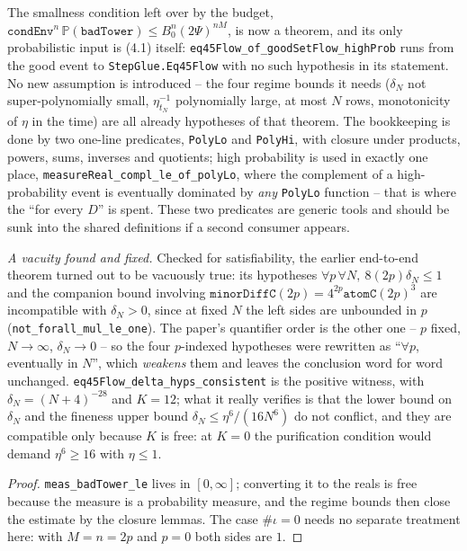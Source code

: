 \begin{lemma}\label{lem:eq412-small}
  \leanok{}
  The smallness condition left over by the budget,
  $\texttt{condEnv}^n\,\mathbb P(\texttt{badTower})\le B_0^n(2\Psi)^{nM}$, is now a theorem, and
  its only probabilistic input is (4.1) itself: \texttt{eq45Flow\_of\_goodSetFlow\_highProb} runs
  from the good event to \texttt{StepGlue.Eq45Flow} with no such hypothesis in its statement.  No
  new assumption is introduced -- the four regime bounds it needs
  ($\delta_N$ not super-polynomially small, $\eta_{t_N}^{-1}$ polynomially large, at most $N$
  rows, monotonicity of $\eta$ in the time) are all already hypotheses of that theorem.  The
  bookkeeping is done by two one-line predicates, \texttt{PolyLo} and \texttt{PolyHi}, with
  closure under products, powers, sums, inverses and quotients; high probability is used in
  exactly one place, \texttt{measureReal\_compl\_le\_of\_polyLo}, where the complement of a
  high-probability event is eventually dominated by \emph{any} \texttt{PolyLo} function -- that is
  where the ``for every $D$'' is spent.  These two predicates are generic tools and should be sunk
  into the shared definitions if a second consumer appears.

  \emph{A vacuity found and fixed.}  Checked for satisfiability, the earlier end-to-end theorem
  turned out to be vacuously true: its hypotheses $\forall p\,\forall N,\ 8(2p)\delta_N\le1$ and
  the companion bound involving $\texttt{minorDiffC}(2p)=4^{2p}\texttt{atomC}(2p)^3$ are
  incompatible with $\delta_N>0$, since at fixed $N$ the left sides are unbounded in $p$
  (\texttt{not\_forall\_mul\_le\_one}).  The paper's quantifier order is the other one -- $p$
  fixed, $N\to\infty$, $\delta_N\to0$ -- so the four $p$-indexed hypotheses were rewritten as
  ``$\forall p$, eventually in $N$'', which \emph{weakens} them and leaves the conclusion word for
  word unchanged.  \texttt{eq45Flow\_delta\_hyps\_consistent} is the positive witness, with
  $\delta_N=(N+4)^{-28}$ and $K=12$; what it really verifies is that the lower bound on $\delta_N$
  and the fineness upper bound $\delta_N\le\eta^6/(16N^6)$ do not conflict, and they are
  compatible only because $K$ is free: at $K=0$ the purification condition would demand
  $\eta^6\ge16$ with $\eta\le1$.
\end{lemma}
\begin{proof}\leanok
  \texttt{meas\_badTower\_le} lives in $[0,\infty]$; converting it to the reals is free because
  the measure is a probability measure, and the regime bounds then close the estimate by the
  closure lemmas.  The case $\#\iota=0$ needs no separate treatment here: with $M=n=2p$ and $p=0$
  both sides are $1$.
\end{proof}

